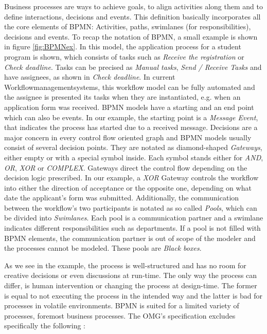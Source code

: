 Business processes are ways to achieve goals, to align activities along them and to define interactions, decisions and events. This definition basically incorporates all the core elements of BPMN: Activities, paths, swimlanes (for responsibilities), decisions and events. To recap the notation of BPMN, a small example is shown in figure \ref{fig:BPMNex}. 
In this model, the application process for a student program is shown, which consists of tasks such as \textit{Receive the registration} or \textit{Check deadline}. Tasks can be precised as \textit{Manual tasks}, \textit{Send / Receive Tasks} and have assignees, as shown in \textit{Check deadline}. In current Workflowmanagementsystems, this workflow model can be fully automated and the assignee is presented its tasks when they are instantiated, e.g. when an application form was received. BPMN models have a starting and an end point which can also be events. In our example, the starting point is a \textit{Message Event}, that indicates the process has started due to a received message. 
Decisions are a major concern in every control flow oriented graph and BPMN models usually consist of several decision points. They are notated as diamond-shaped \textit{Gateways}, either empty or with a special symbol inside. Each symbol stands either for \textit{AND}, \textit{OR}, \textit{XOR} or \textit{COMPLEX}. Gateways direct the control flow depending on the decision logic prescribed. In our example, a \textit{XOR} Gateway controls the workflow into either the direction of acceptance or the opposite one, depending on what date the applicant's form was submitted. Additionally, the communication between the workflow's two participants is notated as so called \textit{Pools}, which can be divided into \textit{Swimlanes}. Each pool is a communication partner and a swimlane indicates different responsibilities such as departments. If a pool is not filled with BPMN elements, the communication partner is out of scope of the modeler and the processes cannot be modeled. These pools are \textit{Black boxes}. 

As we see in the example, the process is well-structured and has no room for creative decisions or even discussions at run-time. The only way the process can differ, is human intervention or changing the process at design-time. The former is equal to not executing the process in the intended way and the latter is bad for processes in volatile environments. BPMN is suited for a limited variety of processes, foremost business processes. The OMG's specification excludes specifically the following \cite{BPMNspec}: 

